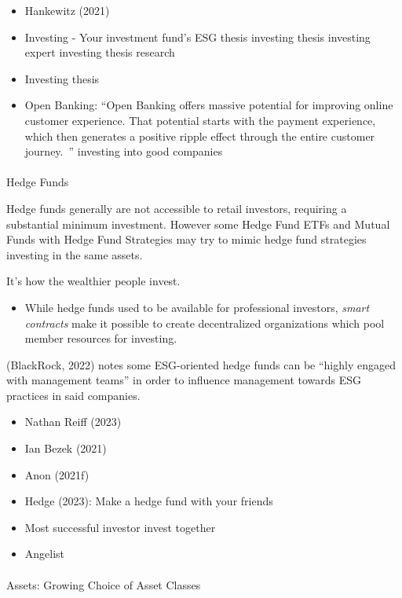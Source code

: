 \documentclass[
  letterpaper,
  DIV=11,
  numbers=noendperiod]{scrartcl}
\makeatletter
\let\oldparagraph\paragraph
\renewcommand{\paragraph}{
    \@ifstar
      \xxxParagraphStar
      \xxxParagraphNoStar
  }
\newcommand{\xxxParagraphStar}[1]{\oldparagraph*{#1}\mbox{}}
\newcommand{\xxxParagraphNoStar}[1]{\oldparagraph{#1}\mbox{}}
\providecommand{\tightlist}{%
  \setlength{\itemsep}{0pt}\setlength{\parskip}{0pt}}\usepackage{longtable,booktabs,array}
\makeatother
\begin{document}
\begin{itemize}
\item
  Hankewitz (2021)
\item
  Investing - Your investment fund's ESG thesis investing thesis
  investing expert investing thesis research
\item
  Investing thesis
\item
  Open Banking: ``Open Banking offers massive potential for improving
  online customer experience. That potential starts with the payment
  experience, which then generates a positive ripple effect through the
  entire customer journey.~'' investing into good companies
\end{itemize}

\paragraph{Hedge Funds}\label{hedge-funds}

Hedge funds generally are not accessible to retail investors, requiring
a substantial minimum investment. However some Hedge Fund ETFs and
Mutual Funds with Hedge Fund Strategies may try to mimic hedge fund
strategies investing in the same assets.

It's how the wealthier people invest.

\begin{itemize}
\tightlist
\item
  While hedge funds used to be available for professional investors,
  \emph{smart contracts} make it possible to create decentralized
  organizations which pool member resources for investing.
\end{itemize}

(BlackRock, 2022) notes some ESG-oriented hedge funds can be ``highly
engaged with management teams'' in order to influence management towards
ESG practices in said companies.

\begin{itemize}
\item
  Nathan Reiff (2023)
\item
  Ian Bezek (2021)
\item
  Anon (2021f)
\item
  Hedge (2023): Make a hedge fund with your friends
\item
  Most successful investor invest together
\item
  Angelist
\end{itemize}

\paragraph{Assets: Growing Choice of Asset
Classes}\label{assets-growing-choice-of-asset-classes}
\end{document}
